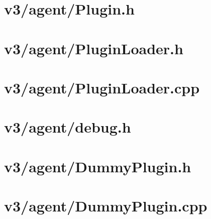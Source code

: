 

\section{v3/agent/Plugin.h}



\section{v3/agent/PluginLoader.h}



\section{v3/agent/PluginLoader.cpp}



\section{v3/agent/debug.h}



\section{v3/agent/DummyPlugin.h}



\section{v3/agent/DummyPlugin.cpp}


